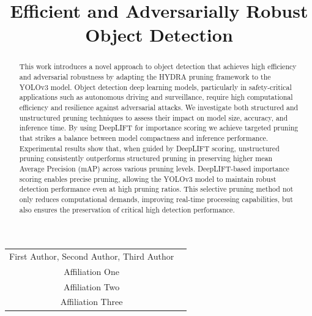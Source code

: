 \documentclass[10pt]{cai}
\begin{document}
\def\conferenceyear{2025}
\begin{center}

\title{Efficient and Adversarially Robust Object Detection}
\maketitle

\thispagestyle{empty}

\begin{tabular}{cc}
First Author\upstairs{\affilone,*}, Second Author\upstairs{\affilone}, Third Author\upstairs{\affilthree}
\\[0.25ex]
{\small \upstairs{\affilone} Affiliation One} \\
{\small \upstairs{\affiltwo} Affiliation Two} \\
{\small \upstairs{\affilthree} Affiliation Three} \\
\end{tabular}
    

\vspace*{0.2in}
\end{center}

\begin{abstract}
This work introduces a novel approach to object detection that achieves high efficiency and adversarial robustness by adapting the HYDRA pruning framework to the YOLOv3 model. Object detection deep learning models, particularly in safety-critical applications such as autonomous driving and surveillance, require high computational efficiency and resilience against adversarial attacks. We investigate both structured and unstructured pruning techniques to assess their impact on model size, accuracy, and inference time. By using DeepLIFT for importance scoring we achieve targeted pruning that strikes a balance between model compactness and inference performance. Experimental results show that, when guided by DeepLIFT scoring, unstructured pruning consistently outperforms structured pruning in preserving higher mean Average Precision (mAP) across various pruning levels. DeepLIFT-based importance scoring enables precise pruning, allowing the YOLOv3 model to maintain robust detection performance even at high pruning ratios. This selective pruning method not only reduces computational demands, improving real-time processing capabilities, but also ensures the preservation of critical high detection performance.
\end{abstract}
\end{document}
